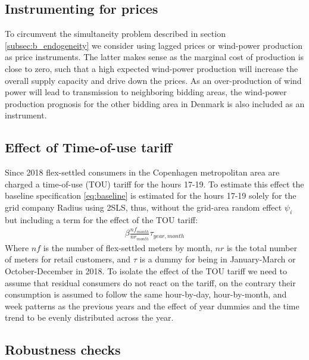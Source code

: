 \subsection{Instrumenting for prices}
\label{subsec:instruments}
To circumvent the simultaneity problem described in section \ref{subsec:b_endogeneity} we consider using lagged prices or wind-power production as price instruments. The latter makes sense as the marginal cost of production is close to zero, such that a high expected wind-power production will increase the overall supply capacity and drive down the prices. As an over-production of wind power will lead to transmission to neighboring bidding areas, the wind-power production prognosis for the other bidding area in Denmark is also included as an instrument.

\subsection{Effect of Time-of-use tariff}
Since 2018 flex-settled consumers in the Copenhagen metropolitan area are charged a time-of-use (TOU) tariff for the hours 17-19. To estimate this effect the baseline specification \ref{eq:baseline} is estimated for the hours 17-19 solely for the grid company Radius using 2SLS, thus, without the grid-area random effect $\psi_i$ but including a term for the effect of the TOU tariff:
\begin{align}
  \beta\frac{nf_{month}}{nr_{month}}\tau_{year,month}
  \label{eq:tout}
\end{align}
Where $nf$ is the number of flex-settled meters by month, $nr$ is the total number of meters for retail customers, and $\tau$ is a dummy for being in January-March or October-December in 2018. To isolate the effect of the TOU tariff we need to assume that residual consumers do not react on the tariff, on the contrary their consumption is assumed to follow the same hour-by-day, hour-by-month, and week patterns as the previous years and the effect of year dummies and the time trend to be evenly distributed across the year.



\subsection{Robustness checks}
\label{subsec:robustness}
